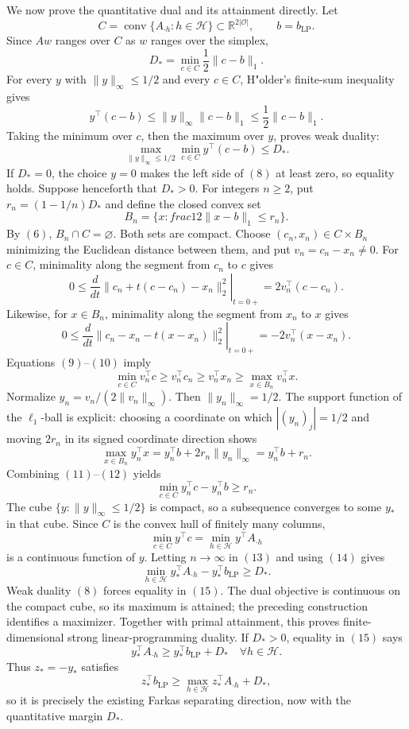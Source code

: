 We now prove the quantitative dual and its attainment directly. Let
\[
C=\operatorname{conv}\{A_{\cdot h}:h\in\mathcal H\}\subset\mathbb R^{2|\mathcal O|},\qquad b=b_{\mathrm{LP}}.
\]
Since \(Aw\) ranges over \(C\) as \(w\) ranges over the simplex,
\[
D_*=\min_{c\in C}\frac12\lVert c-b\rVert_1.
\tag{6}
\]
For every \(y\) with \(\lVert y\rVert_\infty\le1/2\) and every \(c\in C\), H"older's finite-sum inequality gives
\[
y^\top(c-b)\le\lVert y\rVert_\infty\lVert c-b\rVert_1\le\frac12\lVert c-b\rVert_1.
\tag{7}
\]
Taking the minimum over \(c\), then the maximum over \(y\), proves weak duality:
\[
\max_{\lVert y\rVert_\infty\le1/2}\min_{c\in C}y^\top(c-b)\le D_*.
\tag{8}
\]
If \(D_*=0\), the choice \(y=0\) makes the left side of \((8)\) at least zero, so equality holds. Suppose henceforth that \(D_*>0\). For integers \(n\ge2\), put \(r_n=(1-1/n)D_*\) and define the closed convex set
\[
B_n=\{x:	frac12\lVert x-b\rVert_1\le r_n\}.
\]
By \((6)\), \(B_n\cap C=\varnothing\). Both sets are compact. Choose \((c_n,x_n)\in C\times B_n\) minimizing the Euclidean distance between them, and put \(v_n=c_n-x_n\ne0\). For \(c\in C\), minimality along the segment from \(c_n\) to \(c\) gives
\[
0\le\left.\frac{d}{dt}\lVert c_n+t(c-c_n)-x_n\rVert_2^2\right|_{t=0+}=2v_n^\top(c-c_n).
\tag{9}
\]
Likewise, for \(x\in B_n\), minimality along the segment from \(x_n\) to \(x\) gives
\[
0\le\left.\frac{d}{dt}\lVert c_n-x_n-t(x-x_n)\rVert_2^2\right|_{t=0+}=-2v_n^\top(x-x_n).
\tag{10}
\]
Equations \((9)\)--\((10)\) imply
\[
\min_{c\in C}v_n^\top c\ge v_n^\top c_n\ge v_n^\top x_n\ge\max_{x\in B_n}v_n^\top x.
\tag{11}
\]
Normalize \(y_n=v_n/(2\lVert v_n\rVert_\infty)\). Then \(\lVert y_n\rVert_\infty=1/2\). The support function of the \(\ell_1\)-ball is explicit: choosing a coordinate on which \(|(y_n)_j|=1/2\) and moving \(2r_n\) in its signed coordinate direction shows
\[
\max_{x\in B_n}y_n^\top x=y_n^\top b+2r_n\lVert y_n\rVert_\infty=y_n^\top b+r_n.
\tag{12}
\]
Combining \((11)\)--\((12)\) yields
\[
\min_{c\in C}y_n^\top c-y_n^\top b\ge r_n.
\tag{13}
\]
The cube \(\{y:\lVert y\rVert_\infty\le1/2\}\) is compact, so a subsequence converges to some \(y_*\) in that cube. Since \(C\) is the convex hull of finitely many columns,
\[
\min_{c\in C}y^\top c=\min_{h\in\mathcal H}y^\top A_{\cdot h}
\tag{14}
\]
is a continuous function of \(y\). Letting \(n\to\infty\) in \((13)\) and using \((14)\) gives
\[
\min_{h\in\mathcal H}y_*^\top A_{\cdot h}-y_*^\top b_{\mathrm{LP}}\ge D_*.
\tag{15}
\]
Weak duality \((8)\) forces equality in \((15)\). The dual objective is continuous on the compact cube, so its maximum is attained; the preceding construction identifies a maximizer. Together with primal attainment, this proves finite-dimensional strong linear-programming duality. If \(D_*>0\), equality in \((15)\) says
\[
y_*^\top A_{\cdot h}\ge y_*^\top b_{\mathrm{LP}}+D_*\quad\forall h\in\mathcal H.
\tag{16}
\]
Thus \(z_*=-y_*\) satisfies
\[
z_*^\top b_{\mathrm{LP}}\ge\max_{h\in\mathcal H}z_*^\top A_{\cdot h}+D_*,
\tag{17}
\]
so it is precisely the existing Farkas separating direction, now with the quantitative margin \(D_*\).

